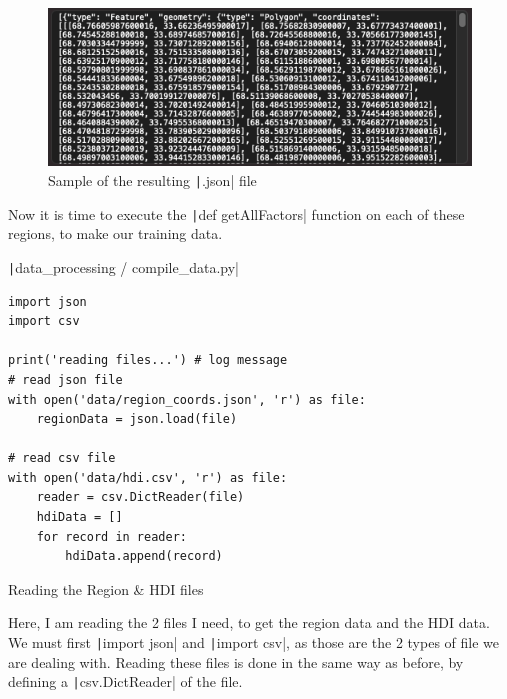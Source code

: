 \documentclass[12pt]{report}
\newcommand{\pil}[1]{\protect\texttt|#1|}
\begin{document}
\begin{figure}[H]
\centering
\includegraphics[width=14cm]{ss5.4.png}
\caption{Sample of the resulting \pil{.json} file}\label{fig:ss5.4}
\end{figure}

Now it is time to execute the \pil{def getAllFactors} function on each of these regions, to make our training data.

\begin{listing}[H]
\pil{data_processing / compile_data.py}
\begin{verbatim}
import json
import csv

print('reading files...') # log message
# read json file
with open('data/region_coords.json', 'r') as file:
    regionData = json.load(file)

# read csv file
with open('data/hdi.csv', 'r') as file:
    reader = csv.DictReader(file)
    hdiData = []
    for record in reader:
        hdiData.append(record)
\end{verbatim}
\caption{Reading the Region \& HDI files}\label{cs:readingRegions}
\end{listing}

Here, I am reading the 2 files I need, to get the region data and the HDI data. We must first \pil{import json} and \pil{import csv}, as those are the 2 types of file we are dealing with. Reading these files is done in the same way as before, by defining a \pil{csv.DictReader} of the file.

\begin{center}
\end{center}
\end{document}
